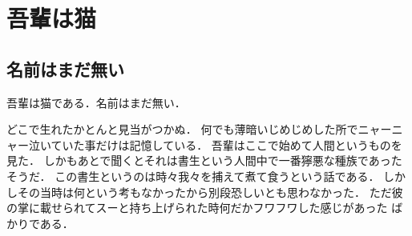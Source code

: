 \documentclass[openany,11pt,report]{ltjsbook}
\begin{document}
\chapter{吾輩は猫}
\section{名前はまだ無い}
吾輩は猫である．名前はまだ無い．

どこで生れたかとんと見当がつかぬ．
何でも薄暗いじめじめした所でニャーニャー泣いていた事だけは記憶している．
吾輩はここで始めて人間というものを見た．
しかもあとで聞くとそれは書生という人間中で一番獰悪な種族であったそうだ．
この書生というのは時々我々を捕えて煮て食うという話である．
しかしその当時は何という考もなかったから別段恐しいとも思わなかった．
ただ彼の掌に載せられてスーと持ち上げられた時何だかフワフワした感じがあった
ばかりである．
\end{document}
